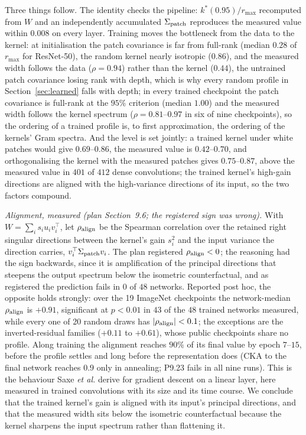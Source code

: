 \documentclass[10pt,journal,compsoc]{IEEEtran}
\begin{document}
Three things follow. The identity checks the pipeline:
$k^*(0.95)/r_{\max}$ recomputed from $W$ and an independently accumulated
$\Sigma_{\rm patch}$ reproduces the measured value within $0.008$ on every
layer. Training moves the bottleneck from the data to the kernel: at
initialisation the patch covariance is far from full-rank (median $0.28$
of $r_{\max}$ for ResNet-50), the random kernel nearly isotropic ($0.86$),
and the measured width follows the data ($\rho = 0.94$) rather than the
kernel ($0.44$), the untrained patch covariance losing rank with depth,
which is why every random profile in Section~\ref{sec:learned} falls with
depth; in every trained checkpoint the patch covariance is full-rank at
the $95\%$ criterion (median $1.00$) and the measured width follows the
kernel spectrum ($\rho = 0.81$--$0.97$ in six of nine checkpoints), so the
ordering of a trained profile is, to first approximation, the ordering of
the kernels' Gram spectra. And the level is set jointly: a trained kernel
under white patches would give $0.69$--$0.86$, the measured value is
$0.42$--$0.70$, and orthogonalising the kernel with the measured patches
gives $0.75$--$0.87$, above the measured value in $401$ of $412$ dense
convolutions; the trained kernel's high-gain directions are aligned with
the high-variance directions of its input, so the two factors compound.

\emph{Alignment, measured (plan Section~9.6; the registered sign was
wrong).} With $W = \sum_i s_i u_i v_i^{\top}$, let $\rho_{\rm align}$ be
the Spearman correlation over the retained right singular directions
between the kernel's gain $s_i^2$ and the input variance the direction
carries, $v_i^{\top}\Sigma_{\rm patch}v_i$. The plan registered
$\rho_{\rm align} < 0$; the reasoning had the sign backwards, since it is
amplification of the principal directions that steepens the output
spectrum below the isometric counterfactual, and as registered the
prediction fails in $0$ of $48$ networks. Reported post hoc, the opposite
holds strongly: over the 19 ImageNet checkpoints the network-median
$\rho_{\rm align}$ is $+0.91$, significant at $p < 0.01$ in $43$ of the
$48$ trained networks measured, while every one of 20 random draws has
$|\rho_{\rm align}| < 0.1$; the exceptions are the inverted-residual
families ($+0.11$ to $+0.61$), whose public checkpoints share no profile.
Along training the alignment reaches $90\%$ of its final value by epoch
$7$--$15$, before the profile settles and long before the representation
does (CKA to the final network reaches $0.9$ only in annealing; P9.23
fails in all nine runs). This is the behaviour Saxe \emph{et al.}
\cite{saxe2014exact} derive for gradient descent on a linear layer, here
measured in trained convolutions with its size and its time course. We conclude
that the trained kernel's gain is aligned with its input's principal
directions, and that the measured width sits below the isometric
counterfactual because the kernel sharpens the input spectrum rather than
flattening it.
\end{document}
